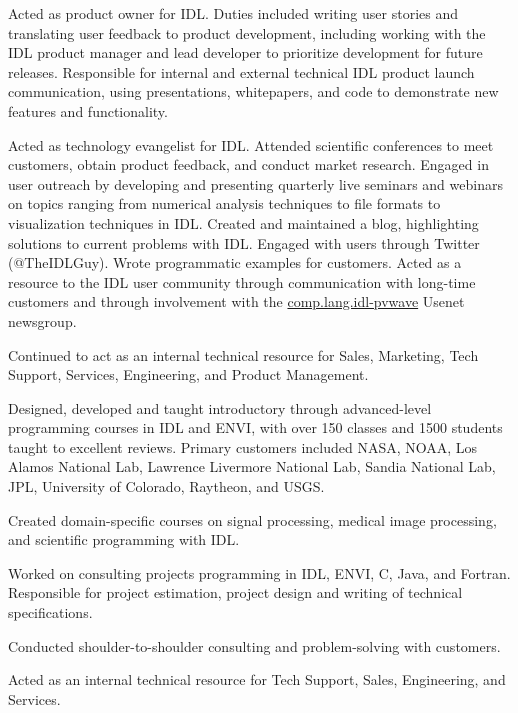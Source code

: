 \begin{compactitem}[\itembullet]
  \item Acted as product owner for IDL. Duties included writing user
    stories and translating user feedback to product development,
    including working with the IDL product manager and lead developer
    to prioritize development for future releases. Responsible for
    internal and external technical IDL product launch communication,
    using presentations, whitepapers, and code to demonstrate new
    features and functionality.
  \item Acted as technology evangelist for IDL. Attended scientific
    conferences to meet customers, obtain product feedback, and
    conduct market research. Engaged in user outreach by developing
    and presenting quarterly live seminars and webinars on topics
    ranging from numerical analysis techniques to file formats to
    visualization techniques in IDL. Created and maintained a blog,
    highlighting solutions to current problems with IDL. Engaged with
    users through Twitter (@TheIDLGuy). Wrote programmatic examples
    for customers. Acted as a resource to the IDL user community
    through communication with long-time customers and through
    involvement with the \url{comp.lang.idl-pvwave} Usenet newsgroup.
  \item Continued to act as an internal technical resource for Sales,
    Marketing, Tech Support, Services, Engineering, and Product
    Management.
\end{compactitem}

\begin{compactitem}[\itembullet]
  \item Designed, developed and taught introductory through
    advanced-level programming courses in IDL and ENVI, with over 150
    classes and 1500 students taught to excellent reviews. Primary
    customers included NASA, NOAA, Los Alamos National Lab, Lawrence
    Livermore National Lab, Sandia National Lab, JPL, University of
    Colorado, Raytheon, and USGS.
  \item Created domain-specific courses on signal processing, medical
    image processing, and scientific programming with IDL.
  \item Worked on consulting projects programming in IDL, ENVI, C,
    Java, and Fortran. Responsible for project estimation, project
    design and writing of technical specifications.
  \item Conducted shoulder-to-shoulder consulting and problem-solving
    with customers.
  \item Acted as an internal technical resource for Tech Support,
    Sales, Engineering, and Services.
\end{compactitem}

